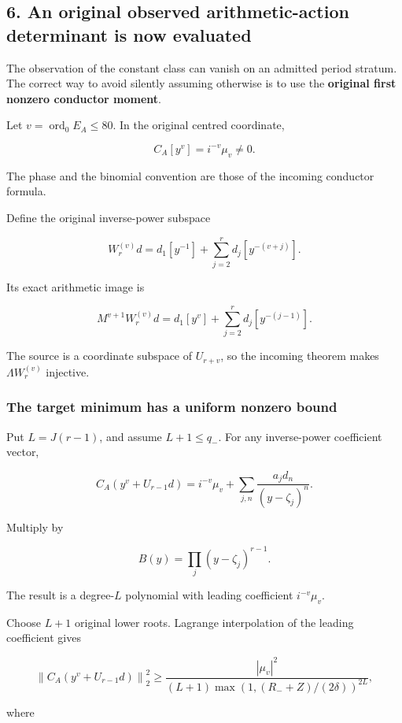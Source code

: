 \documentclass[11pt]{article}
\begin{document}
\subsection{6. An original observed arithmetic-action determinant is now evaluated}\label{an-original-observed-arithmetic-action-determinant-is-now-evaluated}

The observation of the constant class can vanish on an admitted period stratum. The correct way to avoid silently assuming otherwise is to use the \textbf{original first nonzero conductor moment}.

Let \(v=\operatorname{ord}_0E_A\le80\). In the original centred coordinate,

\[
C_A[y^v]=i^{-v}\mu_v\ne0.
\]

The phase and the binomial convention are those of the incoming conductor formula.

Define the original inverse-power subspace

\[
W_r^{(v)}d
=
d_1[y^{-1}]
+\sum_{j=2}^{r}d_j[y^{-(v+j)}].
\]

Its exact arithmetic image is

\[
\boxed{
M^{v+1}W_r^{(v)}d
=
d_1[y^v]
+\sum_{j=2}^{r}d_j[y^{-(j-1)}].
}
\tag{35}
\]

The source is a coordinate subspace of \(U_{r+v}\), so the incoming theorem makes \(\Lambda W_r^{(v)}\) injective.

\subsubsection{The target minimum has a uniform nonzero bound}\label{the-target-minimum-has-a-uniform-nonzero-bound}

Put \(L=J(r-1)\), and assume \(L+1\le q_-\). For any inverse-power coefficient vector,

\[
C_A(y^v+U_{r-1}d)
=
i^{-v}\mu_v+
\sum_{j,n}\frac{a_jd_n}{(y-\zeta_j)^n}.
\]

Multiply by

\[
B(y)=\prod_j(y-\zeta_j)^{r-1}.
\]

The result is a degree-\(L\) polynomial with leading coefficient \(i^{-v}\mu_v\).

Choose \(L+1\) original lower roots. Lagrange interpolation of the leading coefficient gives

\[
\left\|C_A(y^v+U_{r-1}d)\right\|_2^2
\ge
\frac{|\mu_v|^2}
{(L+1)\max(1,(R_-+Z)/(2\delta))^{2L}},
\tag{36}
\]

where
\end{document}
